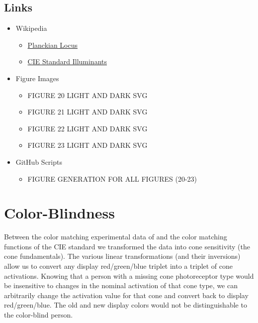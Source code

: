 \documentclass{article}
\begin{document}
\subsection{Links} %

\begin{itemize}
    \item Wikipedia
    \begin{itemize}
        \item \href{https://en.wikipedia.org/wiki/Planckian_locus}{Planckian Locus}
        \item \href{https://en.wikipedia.org/wiki/Standard_illuminant}{CIE Standard Illuminants}
    \end{itemize}
    \item Figure Images
    \begin{itemize}
        \item FIGURE 20 LIGHT AND DARK SVG
        \item FIGURE 21 LIGHT AND DARK SVG
        \item FIGURE 22 LIGHT AND DARK SVG
        \item FIGURE 23 LIGHT AND DARK SVG
    \end{itemize}
    \item GitHub Scripts
    \begin{itemize}
        \item FIGURE GENERATION FOR ALL FIGURES (20-23)
    \end{itemize}
\end{itemize}


\section{Color-Blindness} \label{sec:color_blindndess}

Between the color matching experimental data of \cite{stiles1959npl} and the color matching functions of the CIE standard we transformed the data into cone sensitivity (the cone fundamentals).  The various linear transformations (and their inversions) allow us to convert any display red/green/blue triplet into a triplet of cone activations.  Knowing that a person with a missing cone photoreceptor type would be insensitive to changes in the nominal activation of that cone type, we can arbitrarily change the activation value for that cone and convert back to display red/green/blue.  The old and new display colors would not be distinguishable to the color-blind person.
\end{document}
